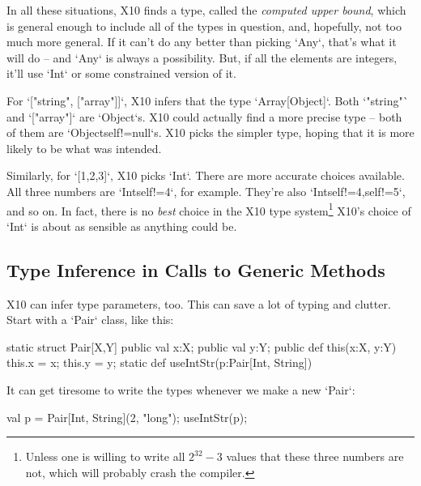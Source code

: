 In all these situations, X10 finds a type, called the {\em computed upper
bound}, which is general enough to include all of the types in question, and,
hopefully, not too much more general.  If it can't do any better than picking
\xcd`Any`, that's what it will do -- and \xcd`Any` is always a possibility.
But, if all the elements are integers, it'll use \xcd`Int` or some constrained
version of it.  

For \xcd`["string", ["array"]]`, X10 infers that the type \xcd`Array[Object]`.
Both \xcd`"string"` and \xcd`["array"]` are \xcd`Object`s.  X10 could actually
find a more precise type -- both of them are \xcd`Object{self!=null}`s. X10
picks the simpler type, hoping that it is more likely to be what was intended.

Similarly, for \xcd`[1,2,3]`, X10 picks \xcd`Int`.  There are more accurate
choices available.  All three numbers are \xcd`Int{self!=4}`, for example.
They're also \xcd`Int{self!=4,self!=5}`, and so on.  In fact, there is no {\em
best} choice in the X10 type system\footnote{Unless one is willing to write
all {$2^{32}-3$} values that these three numbers are not, which will probably
crash the compiler.}  X10's choice of \xcd`Int` is about as sensible as
anything could be. 





\subsection{Type Inference in Calls to Generic Methods}

X10 can infer type parameters, too.  This can save a lot of typing and
clutter.  Start with a \xcd`Pair` class, like this: 
\begin{xtennum}[]
static struct Pair[X,Y]{
  public val x:X;
  public val y:Y;
  public def this(x:X, y:Y) {
    this.x = x; this.y = y;
  }
}
static def useIntStr(p:Pair[Int, String]){}
\end{xtennum}

It can get tiresome to write the types whenever we make a new \xcd`Pair`: 
\begin{xtennum}[]
val p = Pair[Int, String](2, "long");
useIntStr(p);
\end{xtennum}

